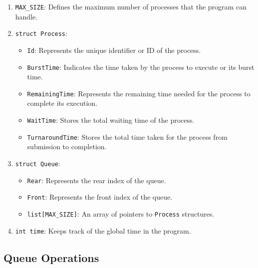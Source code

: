 \documentclass{article}
\begin{document}
\begin{enumerate}[label=\textbf{\arabic*.}]
  \item \texttt{MAX\_SIZE}: Defines the maximum number of processes that the program can handle.
  
  \item \texttt{struct Process}:
  \begin{itemize}[label=--]
      \item \texttt{Id}: Represents the unique identifier or ID of the process.
      \item \texttt{BurstTime}: Indicates the time taken by the process to execute or its burst time.
      \item \texttt{RemainingTime}: Represents the remaining time needed for the process to complete its execution.
      \item \texttt{WaitTime}: Stores the total waiting time of the process.
      \item \texttt{TurnaroundTime}: Stores the total time taken for the process from submission to completion.
  \end{itemize}
  
  \item \texttt{struct Queue}:
  \begin{itemize}[label=--]
      \item \texttt{Rear}: Represents the rear index of the queue.
      \item \texttt{Front}: Represents the front index of the queue.
      \item \texttt{list[MAX\_SIZE]}: An array of pointers to \texttt{Process} structures.
  \end{itemize}
  
  \item \texttt{int time}: Keeps track of the global time in the program.
\end{enumerate}

\vspace{1\baselineskip}
\subsection{Queue Operations}
\vspace{\baselineskip}
\end{document}
